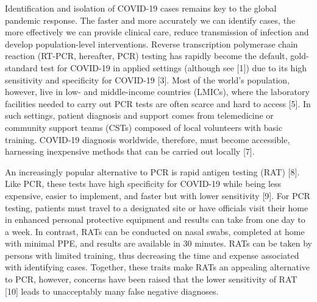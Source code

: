 \documentclass[]{elsarticle} %
\begin{document}
Identification and isolation of COVID-19 cases remains key to the global pandemic response.
The faster and more accurately we can identify cases, the more effectively we can provide clinical care, reduce transmission of infection and develop population-level interventions.
Reverse transcription polymerase chain reaction (RT-PCR, hereafter, PCR) testing has rapidly become the default, gold-standard test for COVID-19 in applied settings (although see {[}1{]}) due to its high sensitivity and specificity for COVID-19 {[}3{]}.
Most of the world's population, however, live in low- and middle-income countries (LMICs), where the laboratory facilities needed to carry out PCR tests are often scarce and hard to access {[}5{]}.
In such settings, patient diagnosis and support comes from telemedicine or community support teams (CSTs) composed of local volunteers with basic training.
COVID-19 diagnosis worldwide, therefore, must become accessible, harnessing inexpensive methods that can be carried out locally {[}7{]}.

An increasingly popular alternative to PCR is rapid antigen testing (RAT) {[}8{]}.
Like PCR, these tests have high specificity for COVID-19 while being less expensive, easier to implement, and faster but with lower sensitivity {[}9{]}.
For PCR testing, patients must travel to a designated site or have officials visit their home in enhanced personal protective equipment and results can take from one day to a week.
In contrast, RATs can be conducted on nasal swabs, completed at home with minimal PPE, and results are available in 30 minutes.
RATs can be taken by persons with limited training, thus decreasing the time and expense associated with identifying cases.
Together, these traits make RATs an appealing alternative to PCR, however, concerns have been raised that the lower sensitivity of RAT {[}10{]} leads to unacceptably many false negative diagnoses.
\end{document}
